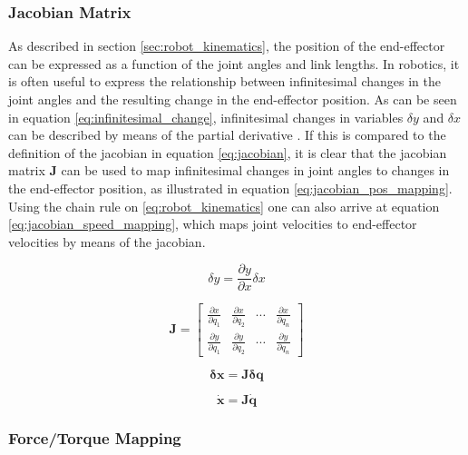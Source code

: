     \subsubsection{Jacobian Matrix}

As described in section \ref{sec:robot_kinematics}, the position of the end-effector can be expressed as a function of the joint angles and link lengths. In robotics, it is often useful to express the relationship between infinitesimal changes in the joint angles and the resulting change in the end-effector position. As can be seen in equation \ref{eq:infinitesimal_change}, infinitesimal changes in variables $\delta y$ and $\delta x$ can be described by means of the partial derivative \cite{modsim}. If this is compared to the definition of the jacobian in equation \ref{eq:jacobian}, it is clear that the jacobian matrix $\bm{J}$ can be used to map infinitesimal changes in joint angles to changes in the end-effector position, as illustrated in equation \ref{eq:jacobian_pos_mapping}. Using the chain rule on \ref{eq:robot_kinematics} one can also arrive at equation \ref{eq:jacobian_speed_mapping}, which maps joint velocities to end-effector velocities by means of the jacobian.

\begin{equation}
    \label{eq:infinitesimal_change}
    \delta  y = \frac{\partial y}{\partial x} \delta x
\end{equation}

\begin{equation}
    \label{eq:jacobian}
    \bm{J} = \begin{bmatrix}
        \frac{\partial x}{\partial q_1} & \frac{\partial x}{\partial q_2} & \cdots & \frac{\partial x}{\partial q_n} \\
        \frac{\partial y}{\partial q_1} & \frac{\partial y}{\partial q_2} & \cdots & \frac{\partial y}{\partial q_n}
    \end{bmatrix}
\end{equation}

\begin{equation}
    \label{eq:jacobian_pos_mapping}
    \bm{\delta x} = \bm{J}\bm{\delta q}
\end{equation}

\begin{equation}
    \label{eq:jacobian_speed_mapping}
    \bm{\dot x} = \bm{J}\bm{\dot q}
\end{equation}

    \subsubsection{Force/Torque Mapping}
    \label{sec:force_torque_mapping}

